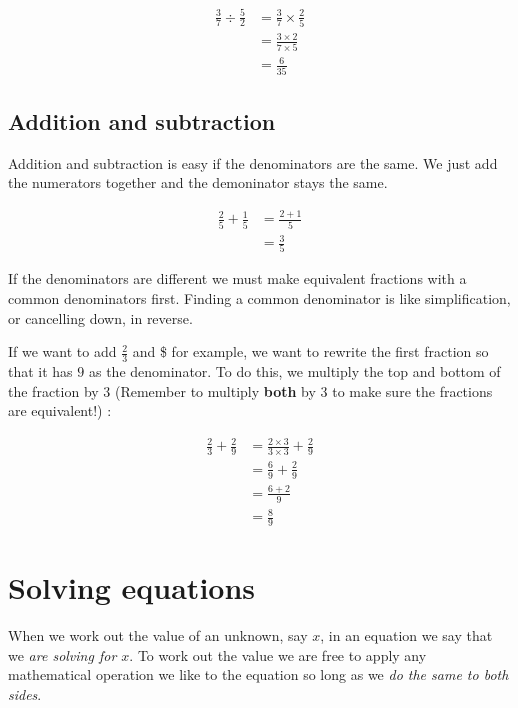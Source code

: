 \documentclass[
  a4paper,
]{scrbook}
\begin{document}
\[
\begin{aligned} \frac{3}{7} \div \frac{5}{2} &= \frac{3}{7} \times \frac{2}{5} \\
&= \frac{3 \times 2}{7 \times 5} \\
&= \frac{6}{35}
\end{aligned}
\]

\hypertarget{addition-and-subtraction-1}{%
\section{Addition and subtraction}\label{addition-and-subtraction-1}}

Addition and subtraction is easy if the denominators are the same. We
just add the numerators together and the demoninator stays the same.

\[
\begin{aligned} \frac{2}{5} + \frac{1}{5} &= \frac{2+1}{5} \\
&= \frac{3}{5}
\end{aligned}
\]

If the denominators are different we must make equivalent fractions with
a common denominators first. Finding a common denominator is like
simplification, or cancelling down, in reverse.

If we want to add \(\frac{2}{3}\) and \$ for example, we want
to rewrite the first fraction so that it has \(9\) as the denominator.
To do this, we multiply the top and bottom of the fraction by \(3\)
(Remember to multiply \textbf{both} by \(3\) to make sure the fractions
are equivalent!) :

\[
\begin{aligned} \frac{2}{3} + \frac{2}{9} &= \frac{2 \times 3}{3 \times 3} + \frac{2}{9} \\
&= \frac{6}{9} + \frac{2}{9} \\
&= \frac{6 + 2}{9} \\
&= \frac{8}{9}
\end{aligned}
\]


\hypertarget{solving-equations}{%
\chapter{Solving equations}\label{solving-equations}}

When we work out the value of an unknown, say \(x\), in an equation we
say that we \emph{are solving for \(x\)}. To work out the value we are
free to apply any mathematical operation we like to the equation so long
as we \emph{do the same to both sides}.
\end{document}
